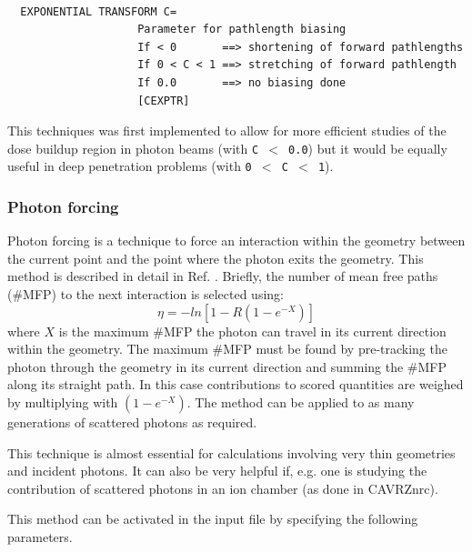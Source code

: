 \documentclass[12pt,twoside]{article}  %
\begin{document}
\begin{verbatim}

  EXPONENTIAL TRANSFORM C=
                    Parameter for pathlength biasing 
                    If < 0       ==> shortening of forward pathlengths
                    If 0 < C < 1 ==> stretching of forward pathlength
                    If 0.0       ==> no biasing done
                    [CEXPTR]
\end{verbatim}
This techniques was first implemented to allow for more efficient studies
of the dose buildup region in photon beams\cite{Ro84,RB86} (with {\tt C $<$
0.0}) but it would be equally useful in deep penetration problems (with
{\tt 0 $<$ C $<$ 1}).

\subsubsection{Photon forcing}

Photon forcing is a technique to force an interaction within the geometry
between the current point and the point where the photon exits the 
geometry. This method is described in detail in Ref. \cite{RB90}.
Briefly, the number of mean free paths (\#MFP)
to the next interaction is selected using:
\begin{equation}
\eta = - ln \left [ 1 - R (1 - e^{-X}) \right ]
\end{equation}
where $X$ is the maximum \#MFP the photon can travel in its current
direction within the geometry. The maximum \#MFP must be found by
pre-tracking the photon through the geometry in its current direction
and summing the \#MFP along its straight path. In this case contributions
to scored quantities are weighed by multiplying with $(1 - e ^{-X})$.
The method can be applied to as many generations of scattered photons
as required.

This technique is almost essential for calculations involving very thin
geometries and incident photons. It can also be very helpful if, e.g. one
is studying the contribution of scattered photons in an ion chamber (as
done in CAVRZnrc).

This method can be activated in the input file by specifying the following
parameters. 
\end{document}
